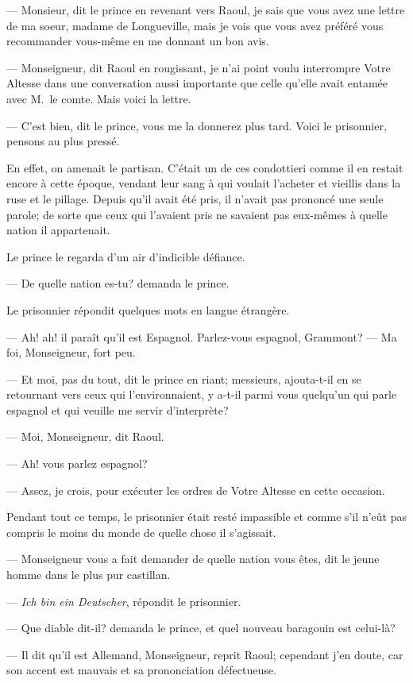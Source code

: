 — Monsieur, dit le prince en revenant vers Raoul, je sais que vous avez une lettre de ma soeur, madame de Longueville, mais je vois que vous avez préféré vous recommander vous-même en me donnant un bon avis.

— Monseigneur, dit Raoul en rougissant, je n'ai point voulu interrompre Votre Altesse dans une conversation aussi importante que celle qu'elle avait entamée avec M.~le comte. Mais voici la lettre.

— C'est bien, dit le prince, vous me la donnerez plus tard. Voici le prisonnier, pensons au plus pressé.

En effet, on amenait le partisan. C'était un de ces condottieri comme il en restait encore à cette époque, vendant leur sang à qui voulait l'acheter et vieillis dans la ruse et le pillage. Depuis qu'il avait été pris, il n'avait pas prononcé une seule parole; de sorte que ceux qui l'avaient pris ne savaient pas eux-mêmes à quelle nation il appartenait.

Le prince le regarda d'un air d'indicible défiance.

— De quelle nation es-tu? demanda le prince.

Le prisonnier répondit quelques mots en langue étrangère.

— Ah! ah! il paraît qu'il est Espagnol. Parlez-vous espagnol, Grammont?
— Ma foi, Monseigneur, fort peu.

— Et moi, pas du tout, dit le prince en riant; messieurs, ajouta-t-il en se retournant vers ceux qui l'environnaient, y a-t-il parmi vous quelqu'un qui parle espagnol et qui veuille me servir d'interprète?

— Moi, Monseigneur, dit Raoul.

— Ah! vous parlez espagnol?

— Assez, je crois, pour exécuter les ordres de Votre Altesse en cette occasion.

Pendant tout ce temps, le prisonnier était resté impassible et comme s'il n'eût pas compris le moins du monde de quelle chose il s'agissait.

— Monseigneur vous a fait demander de quelle nation vous êtes, dit le jeune homme dans le plus pur castillan.

—\textit{ Ich bin ein Deutscher}, répondit le prisonnier.

— Que diable dit-il? demanda le prince, et quel nouveau baragouin est celui-là?

— Il dit qu'il est Allemand, Monseigneur, reprit Raoul; cependant j'en doute, car son accent est mauvais et sa prononciation défectueuse.

